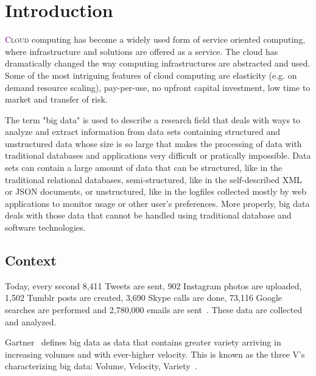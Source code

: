 \chapter{Introduction} \label{chap:Introduction}

\lettrine[lines=4]{\textcolor{purple}{C}}{loud} computing has become a widely used form of service oriented computing, where infrastructure and solutions are offered as a service. The cloud has dramatically changed the way computing infrastructures are abstracted and used. Some of the most intriguing features of cloud computing are elasticity (e.g. on demand resource scaling), pay-per-use, no upfront capital investment, low time to market and transfer of risk. 

The term "big data" is used to describe a research field that deals with ways to analyze and extract information from data sets containing structured and unstructured data whose size is so large that makes the processing of data with traditional databases and applications very difficult or pratically impossible. Data sets can contain a large amount of data that can be structured, like in the traditional relational databases, semi-structured, like in the self-described XML or JSON documents, or unstructured, like in the logfiles collected mostly by web applications to monitor usage or other user's preferences. More properly, big data deals with those data that cannot be handled using traditional database and software technologies. 

\section{Context}\label{sec:context}
Today, every second 8,411 Tweets are sent, 902 Instagram photos are uploaded, 1,502 Tumblr posts are created, 3,690 Skype calls are done, 73,116 Google searches are performed and 2,780,000 emails are sent~\cite{misc:InternetLiveStats}. These data are collected and analyzed. 

Gartner~\cite{Gartner} defines big data as data that contains greater variety arriving in increasing volumes and with ever-higher velocity. This is known as the three V's characterizing  big data: Volume, Velocity, Variety~\cite{WhatIsBigData}. 

